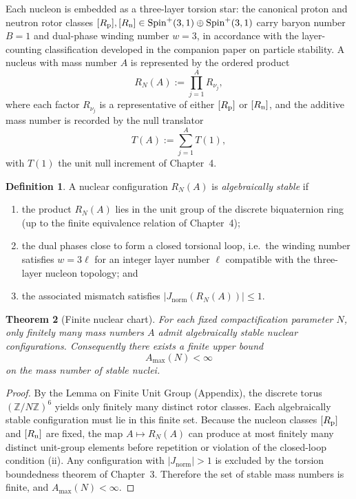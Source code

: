 \documentclass[a4paper]{article}
\newtheorem{theorem}{Theorem}[section]
\theoremstyle{definition}
\newtheorem{definition}[theorem]{Definition}
\theoremstyle{remark}
\newcommand{\Jnorm}{J_{\mathrm{norm}}}
\begin{document}
Each nucleon is embedded as a three-layer torsion star: the canonical proton and neutron rotor classes \( [R_{\rm p}], [R_{\rm n}] \in \mathrm{Spin}^+(3,1) \oplus \mathrm{Spin}^+(3,1) \) carry baryon number \(B=1\) and dual-phase winding number \(w=3\), in accordance with the layer-counting classification developed in the companion paper on particle stability. A nucleus with mass number \(A\) is represented by the ordered product
\[
R_N(A) := \prod_{j=1}^{A} R_{\nu_j},
\]
where each factor \(R_{\nu_j}\) is a representative of either \([R_{\rm p}]\) or \([R_{\rm n}]\), and the additive mass number is recorded by the null translator
\[
T(A) := \sum_{j=1}^{A} T(1),
\]
with \(T(1)\) the unit null increment of Chapter~4.

\begin{definition}
A nuclear configuration \(R_N(A)\) is \emph{algebraically stable} if
\begin{enumerate}[label=(\roman*)]
  \item the product \(R_N(A)\) lies in the unit group of the discrete biquaternion ring (up to the finite equivalence relation of Chapter~4);
  \item the dual phases close to form a closed torsional loop, i.e.\ the winding number satisfies \(w = 3\ell\) for an integer layer number \(\ell\) compatible with the three-layer nucleon topology; and
  \item the associated mismatch satisfies \(|\Jnorm(R_N(A))| \leq 1\).
\end{enumerate}
\end{definition}

\begin{theorem}[Finite nuclear chart]
For each fixed compactification parameter \(N\), only finitely many mass numbers \(A\) admit algebraically stable nuclear configurations. Consequently there exists a finite upper bound
\[
A_{\max}(N) < \infty
\]
on the mass number of stable nuclei.
\end{theorem}

\begin{proof}
By the Lemma on Finite Unit Group (Appendix), the discrete torus \((\mathbb{Z}/N\mathbb{Z})^6\) yields only finitely many distinct rotor classes. Each algebraically stable configuration must lie in this finite set. Because the nucleon classes \([R_{\rm p}]\) and \([R_{\rm n}]\) are fixed, the map \(A \mapsto R_N(A)\) can produce at most finitely many distinct unit-group elements before repetition or violation of the closed-loop condition (ii). Any configuration with \(|\Jnorm| > 1\) is excluded by the torsion boundedness theorem of Chapter~3. Therefore the set of stable mass numbers is finite, and \(A_{\max}(N) < \infty\).
\end{proof}
\end{document}
